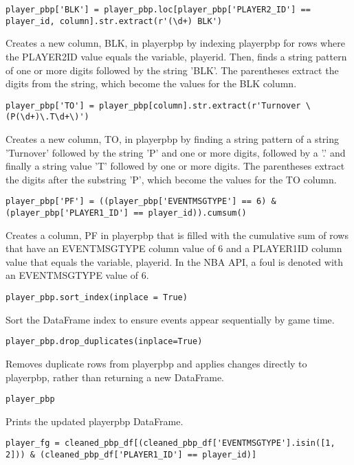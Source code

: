 \documentclass{article}
\begin{document}
\begin{lstlisting}
player_pbp['BLK'] = player_pbp.loc[player_pbp['PLAYER2_ID'] == player_id, column].str.extract(r'(\d+) BLK')
\end{lstlisting}
Creates a new column, BLK, in player\textunderscore pbp by indexing player\textunderscore pbp for rows where the PLAYER2\textunderscore ID value equals the variable, player\textunderscore id. Then, finds a string pattern of one or more digits followed by the string 'BLK'. The parentheses extract the digits from the string, which become the values for the BLK column.
\begin{lstlisting}
player_pbp['TO'] = player_pbp[column].str.extract(r'Turnover \(P(\d+)\.T\d+\)')
\end{lstlisting}
Creates a new column, TO, in player\textunderscore pbp by finding a string pattern of a string 'Turnover' followed by the string 'P' and one or more digits, followed by a '.' and finally a string value 'T' followed by one or more digits. The parentheses extract the digits after the substring 'P', which become the values for the TO column.
\begin{lstlisting}
player_pbp['PF'] = ((player_pbp['EVENTMSGTYPE'] == 6) & (player_pbp['PLAYER1_ID'] == player_id)).cumsum()
\end{lstlisting}
Creates a column, PF in player\textunderscore pbp that is filled with the cumulative sum of rows that have an EVENTMSGTYPE column value of 6 and a PLAYER1\textunderscore ID column value that equals the variable, player\textunderscore id. In the NBA API, a foul is denoted with an EVENTMSGTYPE value of 6.
\begin{lstlisting}
player_pbp.sort_index(inplace = True)
\end{lstlisting}
Sort the DataFrame index to ensure events appear sequentially by game time.
\begin{lstlisting}
player_pbp.drop_duplicates(inplace=True)
\end{lstlisting}
Removes duplicate rows from player\textunderscore pbp and applies changes directly to player\textunderscore pbp, rather than returning a new DataFrame.
\begin{lstlisting}
player_pbp
\end{lstlisting}
Prints the updated player\textunderscore pbp DataFrame.
\begin{lstlisting}
player_fg = cleaned_pbp_df[(cleaned_pbp_df['EVENTMSGTYPE'].isin([1, 2])) & (cleaned_pbp_df['PLAYER1_ID'] == player_id)]
\end{lstlisting}
\end{document}
